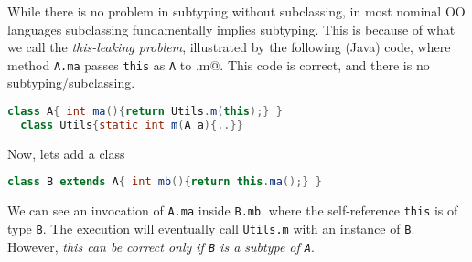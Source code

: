 While there is no problem in subtyping without subclassing, in most nominal OO languages subclassing fundamentally implies subtyping. 
This is because of what we call the
\emph{this-leaking problem}, illustrated by the following
(Java) code, where
method \lstinline{A.ma} passes \lstinline{this} as \lstinline{A} to \Q@Utils.m@.
This code is correct, and there is no subtyping/subclassing{.}\saveSpace\saveSpace
\begin{lstlisting}[language=Java]
  class A{ int ma(){return Utils.m(this);} }
  class Utils{static int m(A a){..}}
\end{lstlisting}
\saveSpace\saveSpace
  Now, lets add a class \Q@B@
\saveSpace\saveSpace\saveSpace
\begin{lstlisting}[language=Java]
  class B extends A{ int mb(){return this.ma();} }  
\end{lstlisting}
\saveSpace\saveSpace
\noindent We can see an invocation of \lstinline{A.ma} inside
\lstinline{B.mb}, where the self-reference \lstinline{this} is of type \lstinline{B}. 
The execution will eventually call \lstinline{Utils.m} with an
instance of \lstinline{B}. However, \emph{this can be correct only if \lstinline{B} is a subtype of
\lstinline{A}}. 

%
%


